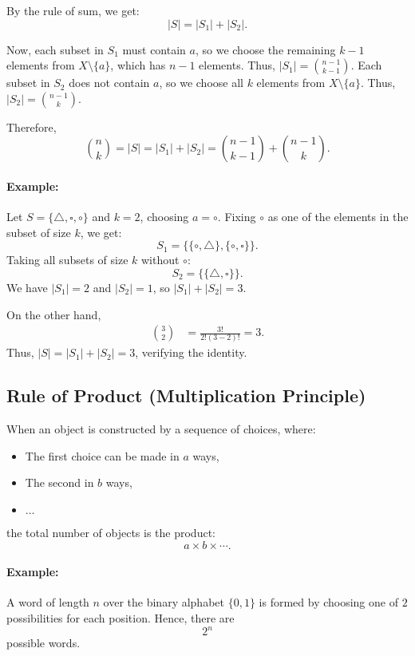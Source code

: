 \documentclass{article}
\begin{document}
By the rule of sum, we get:  
\[
|S| = |S_1| + |S_2|.
\]

Now,  
each subset in \( S_1 \) must contain \( a \), so we choose the remaining \( k-1 \) elements from \( X \setminus \{a\} \), which has \( n-1 \) elements. Thus, \( |S_1| = \binom{n-1}{k-1} \).  
Each subset in \( S_2 \) does not contain \( a \), so we choose all \( k \) elements from \( X \setminus \{a\} \). Thus, \( |S_2| = \binom{n-1}{k} \).  

Therefore,  
\[
\binom{n}{k} = |S| = |S_1| + |S_2| = \binom{n-1}{k-1} + \binom{n-1}{k}.
\]

\paragraph{Example:}  
Let \( S = \{ \triangle, \square, \circ \} \) and \( k = 2 \), choosing \( a = \circ \).  
Fixing \( \circ \) as one of the elements in the subset of size \( k \), we get:  
  \[
  S_1 = \{\{\circ, \triangle\}, \{\circ, \square\}\}.
  \]
Taking all subsets of size \( k \) without \( \circ \):  
  \[
  S_2 = \{\{\triangle, \square\}\}.
  \]
We have \( |S_1| = 2 \) and \( |S_2| = 1 \), so \( |S_1| + |S_2| = 3 \).  

\noindent On the other hand,  
\begin{align*}
\binom{3}{2} &= \frac{3!}{2!(3-2)!} = 3.
\end{align*}
Thus, \( |S| = |S_1| + |S_2| = 3 \), verifying the identity.  


\paragraph{}

\subsection{Rule of Product (Multiplication Principle)}
When an object is constructed by a sequence of choices, where:
\begin{itemize}[nosep]
    \item The first choice can be made in $a$ ways,
    \item The second in $b$ ways,
    \item $\ldots$
\end{itemize}
the total number of objects is the product:
\[
a \times b \times \cdots.
\]

\paragraph{Example:}  
A word of length $n$ over the binary alphabet $\{0,1\}$ is formed by choosing one of $2$ possibilities for each position. Hence, there are
\[
2^n
\]
possible words.
\end{document}
